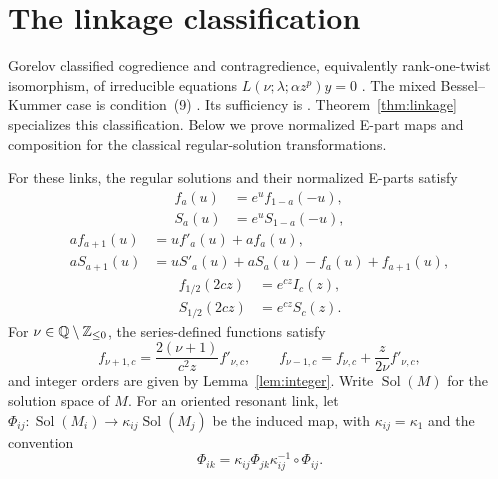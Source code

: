 \section{The linkage classification}\label{sec:linkage}

Gorelov classified cogredience and contragredience, equivalently rank-one-twist
isomorphism, of irreducible equations $L(\nu;\lambda;\alpha z^p)y=0$
\cite[Lemma~12 and proof, p.~7; Lemma~14, p.~7, proof pp.~8--9]{Gorelov2021}.
The mixed Bessel--Kummer case is condition~(9)
\cite[p.~3]{Gorelov2021}. Its sufficiency is
\cite[Theorem~2, condition~(5), p.~138; proof pp.~141--142]{Gorelov2020}.
Theorem~\ref{thm:linkage} specializes this classification.
Below we prove normalized E-part maps and composition for the classical regular-solution transformations.

For these links, the regular solutions and their normalized E-parts satisfy
\begin{equation}\label{eq:link-kummer}
\begin{aligned}
 f_a(u)&=e^u f_{1-a}(-u),\\
 S_a(u)&=e^u S_{1-a}(-u),
\end{aligned}
\end{equation}
\begin{equation}\label{eq:link-contiguity}
\begin{aligned}
 a f_{a+1}(u)&=u f'_a(u)+af_a(u),\\
 aS_{a+1}(u)&=uS'_a(u)+aS_a(u)-f_a(u)+f_{a+1}(u),
\end{aligned}
\end{equation}
\begin{equation}\label{eq:link-half}
\begin{aligned}
 f_{1/2}(2cz)&=e^{cz}I_c(z),\\
 S_{1/2}(2cz)&=e^{cz}S_c(z).
\end{aligned}
\end{equation}
For $\nu\in\mathbb{Q}\setminus\mathbb{Z}_{\le0}$, the series-defined functions satisfy
\begin{equation}\label{eq:link-order}
 f_{\nu+1,c}=\frac{2(\nu+1)}{c^2z}f'_{\nu,c},\qquad
 f_{\nu-1,c}=f_{\nu,c}+\frac{z}{2\nu}f'_{\nu,c},
\end{equation}
and integer orders are given by Lemma~\ref{lem:integer}. Write
$\operatorname{Sol}(M)$ for the solution space of $M$. For an oriented
resonant link, let $\Phi_{ij}:\operatorname{Sol}(M_i)\to
\kappa_{ij}\operatorname{Sol}(M_j)$ be the induced map, with
$\kappa_{ij}=\kappa_1$ and the convention
\begin{equation}\label{eq:link-composition-convention}
\Phi_{ik}=\kappa_{ij}\Phi_{jk}\kappa_{ij}^{-1}\circ\Phi_{ij}.
\end{equation}

